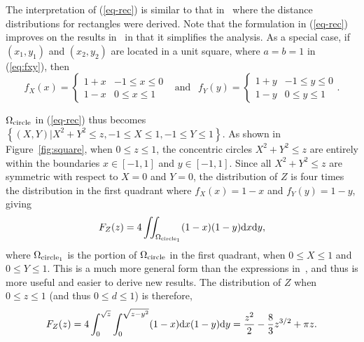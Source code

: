 \documentclass[12pt,draftclsnofoot,onecolumn]{IEEEtran}
\begin{document}
The interpretation of (\ref{eq-rec}) is similar to that in~\cite{ghosh1943distribution, 
ghosh1943random} where the distance distributions for rectangles were derived.
Note that the formulation in (\ref{eq-rec}) improves on the results
in~\cite{zhuang2011random, zhuang2012geometrical} in that it simplifies the analysis.
As a special case, if $(x_1, y_1)$ and $(x_2, y_2)$ are located
in a unit square, where $a=b=1$ in (\ref{eq:fxy}), then
\begin{equation}\label{eq:fxy-sqr}
  f_X(x)=\left\{
    \begin{array}{lr}
      1+x & -1\leq x \leq 0 \\
      1-x & 0 \leq x \leq 1
    \end{array}
  \right.
  ~~\mbox{ and }~~ f_Y(y)=\left\{
    \begin{array}{lr}
      1+y & -1\leq y \leq 0 \\
      1-y & 0 \leq y \leq 1
    \end{array}
  \right..
\end{equation}

$\Omega_{\rm circle}$ in (\ref{eq-rec}) thus becomes $\left\{(X,Y)|X^2+Y^2\leq z, -1 
\leq X \leq 1, -1 \leq Y \leq 1\right\}$. As shown in Figure~\ref{fig:square}, when
$0\leq z\leq1$, the concentric circles $X^2+Y^2\leq z$ are entirely within the 
boundaries $x \in {[-1,1]}$ and $y \in {[-1,1]}$. 
Since all $X^2+Y^2\leq z$ are symmetric with respect to $X=0$ and $Y=0$, the
distribution of $Z$ is four times the distribution in the first quadrant where
$f_X(x)=1-x$ and $f_Y(y)=1-y$, giving
\begin{equation}\label{eq:f_z1}
F_Z(z)=4\iint_{\Omega_{\rm circle_1}}(1-x)(1-y){\rm d}x{\rm d}y, 
\end{equation}
where $\Omega_{\rm circle_1}$ is the portion of $\Omega_{\rm circle}$ in 
the first quadrant, when $0 \leq X \leq 1$ and $0 \leq Y \leq 1$. 
This is a much more general form than the expressions in~\cite{zhuang2011random,
zhuang2012geometrical}, and thus is more useful and easier to derive new results.
The distribution of $Z$ when $0\leq z\leq1$ (and thus $0\leq d\leq1$) is therefore, 
\begin{equation}
F_Z(z)=4\int_0^{\sqrt{z}}\int_0^{\sqrt{z-y^2}}(1-x){\rm d}x(1-y){\rm d}y 
=\frac{z^2}{2}-\frac{8}{3}z^{3/2}+\pi z. \nonumber
\end{equation}
\end{document}
